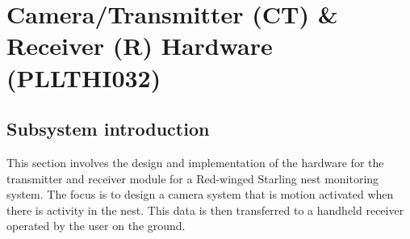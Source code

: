 \documentclass[class=report,11pt,crop=false]{standalone}
\begin{document}
\ifstandalone
\tableofcontents
\fi
\chapter{Camera/Transmitter (CT) \& Receiver (R) Hardware (PLLTHI032)\label{ch:hardware}}



\section{Subsystem introduction}
This section involves the design and implementation of the hardware for the transmitter and receiver module for a Red-winged Starling nest monitoring system. The focus is to design a camera system that is motion activated when there is activity in the nest. This data is then transferred to a handheld receiver operated by the user on the ground. 
\end{document}
